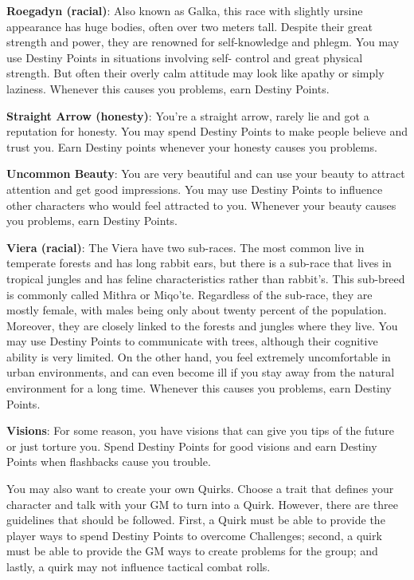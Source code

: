 \begin{multicols}{2}
\textbf{Roegadyn (racial)}: Also known as Galka,
this race with slightly
ursine appearance has
huge bodies, often over
two meters tall. Despite
their great strength and
power, they are renowned
for self-knowledge and
phlegm. You may use
Destiny Points in
situations involving self-
control and great physical
strength. But often their
overly calm attitude may look like apathy or
simply laziness. Whenever this causes you
problems, earn Destiny Points.

\textbf{Straight Arrow (honesty)}: You're a
straight arrow, rarely lie and got a reputation for
honesty. You may spend Destiny Points to make
people believe and trust you. Earn Destiny points
whenever your honesty causes you problems.

\textbf{Uncommon Beauty}: You are very
beautiful and can use your beauty to attract
attention and get good impressions. You may use
Destiny Points to influence other characters who
would feel attracted to you. Whenever your beauty
causes you problems, earn Destiny Points.

\textbf{Viera (racial)}:
The Viera have two sub-races. The most common
live in temperate forests
and has long rabbit ears,
but there is a sub-race that
lives in tropical jungles
and has feline characteristics rather than
rabbit’s. This sub-breed is
commonly called Mithra
or Miqo'te. Regardless of
the sub-race, they are
mostly female, with males
being only about twenty percent of the population.
Moreover, they are closely linked to the forests and
jungles where they live. You may use Destiny
Points to communicate with trees, although their
cognitive ability is very limited. On the other hand,
you feel extremely uncomfortable in urban
environments, and can even become ill if you stay
away from the natural environment for a long time.
Whenever this causes you problems, earn Destiny
Points.

\textbf{Visions}: For some reason, you have visions
that can give you tips of the future or just torture
you. Spend Destiny Points for good visions and
earn Destiny Points when flashbacks cause you
trouble.

You may also want to create your own
Quirks. Choose a trait that defines your character
and talk with your GM to turn into a Quirk.
However, there are three guidelines that should
be followed. First, a Quirk must be able to
provide the player ways to spend Destiny Points
to overcome Challenges; second, a quirk must be
able to provide the GM ways to create problems
for the group; and lastly, a quirk may not
influence tactical combat rolls.


\end{multicols}
